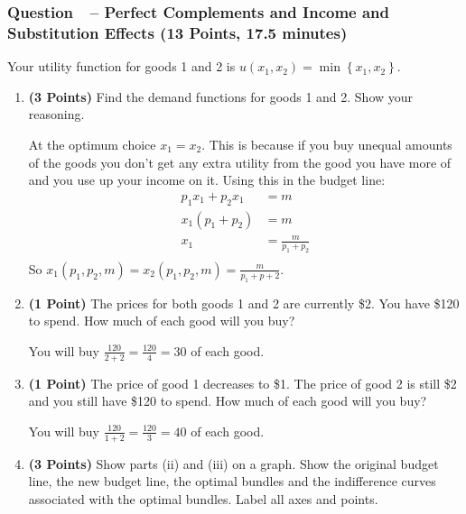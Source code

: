 \documentclass[11pt]{article}
\newcounter{question}[section]
\newcommand{\question}[1]{\refstepcounter{question}
  \subsubsection*{Question~\thequestion~-- #1}}
\newenvironment{subquestions}{
  \begin{enumerate}[label=(\roman*)]}{\end{enumerate}}
\begin{document}
\question{Perfect Complements and Income and Substitution Effects (13 Points, 17.5 minutes)}
Your utility function for goods 1 and 2 is $u\left( x_1,x_2 \right)=\min\left\{ x_1,x_2 \right\}$.
\begin{subquestions}
\item \textbf{(3 Points)} Find the demand functions for goods 1 and 2. Show your reasoning.

  \textcolor{solution-color}{
    At the optimum choice $x_1=x_2$. This is because if you buy unequal amounts of the goods you don't get any extra utility from the good you have more of and you use up your income on it. Using this in the budget line:
    \begin{align*}
      p_1x_1 + p_2x_1 &= m \\
      x_1\left( p_1+p_2 \right) &= m \\
      x_1 &= \frac{m}{p_1+p_2} \\
    \end{align*}
    So $x_1\left( p_1,p_2,m \right)=x_2\left( p_1,p_2,m \right)=\frac{m}{p_1+p+2}$.
  }
  \item \textbf{(1 Point)} The prices for both goods 1 and 2 are currently \$2. You have \$120 to spend. How much of each good will you buy?

  \textcolor{solution-color}{
    You will buy $\frac{120}{2+2}=\frac{120}{4}=30$ of each good.
  }
  \item \textbf{(1 Point)} The price of good 1 decreases to \$1. The price of good 2 is still \$2 and you still have \$120 to spend. How much of each good will you buy?

  \textcolor{solution-color}{
    You will buy $\frac{120}{1+2}=\frac{120}{3}=40$ of each good.
  }
  \item \textbf{(3 Points)} Show parts (ii) and (iii) on a graph. Show the original budget line, the new budget line, the optimal bundles and the indifference curves associated with the optimal bundles. Label all axes and points.
    \begin{center}
    \end{center}


\end{subquestions}
\end{document}
